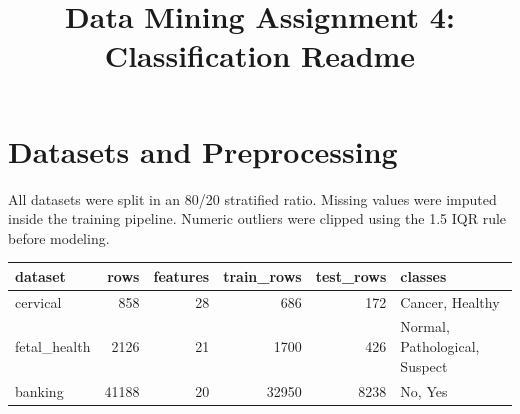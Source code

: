\documentclass[11pt]{article}
\begin{document}
\title{Data Mining Assignment 4: Classification Readme}
\author{}
\date{}
\maketitle
\section*{Datasets and Preprocessing}
All datasets were split in an 80/20 stratified ratio. Missing values were imputed inside the training pipeline. Numeric outliers were clipped using the 1.5 IQR rule before modeling.
\begin{tabular}{lrrrrl}
\toprule
      dataset &   rows &  features &  train\_rows &  test\_rows &                        classes \\
\midrule
     cervical &    858 &        28 &         686 &        172 &                Cancer, Healthy \\
 fetal\_health &   2126 &        21 &        1700 &        426 &  Normal, Pathological, Suspect \\
      banking &  41188 &        20 &       32950 &       8238 &                        No, Yes \\
\bottomrule
\end{tabular}
\end{document}
